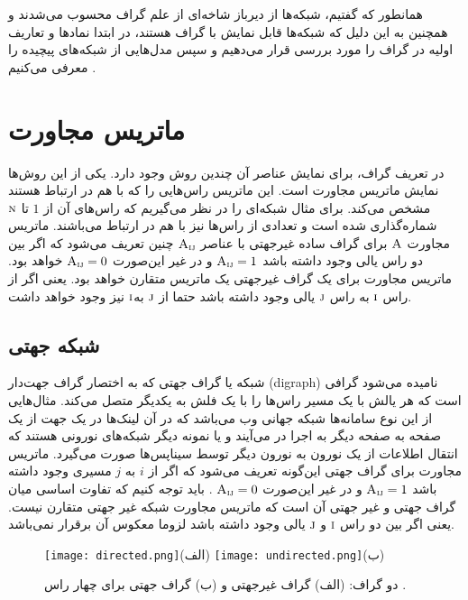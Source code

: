 همانطور که گفتیم، شبکه‌ها از دیرباز شاخه‌ای از علم گراف محسوب می‌شدند و همچنین به این دلیل که شبکه‌ها قابل نمایش با گراف هستند، در ابتدا نماد‌ها و تعاریف اولیه در گراف را مورد بررسی قرار می‌دهیم و سپس مدل‌هایی از شبکه‌های پیچیده را معرفی می‌کنیم \cite{new}.
\section{ماتریس مجاورت}
در تعریف گراف، برای نمایش عناصر آن چندین روش وجود دارد. یکی از این روش‌ها نمایش ماتریس مجاورت است. این ماتریس راس‌هایی را که با هم در ارتباط هستند مشخص می‌کند. برای مثال شبکه‌ای را در نظر می‌گیریم که راس‌های آن از $1$ تا $\textsc{n}$ شماره‌گذاری شده است و تعدادی از راس‌ها نیز با‌ هم در ارتباط می‌باشند. ماتریس مجاورت $\textsc{A}$ برای گراف ساده غیرجهتی با عناصر $\textsc{A}_{\textsc{ij}}$ چنین تعریف می‌شود که اگر بین دو راس یالی وجود داشته باشد $\textsc{A}_{\textsc{ij}} = 1$ و در غیر این‌صورت 
$\textsc{A}_{\textsc{ij}} = 0$ خواهد بود. ماتریس مجاورت برای یک گراف غیرجهتی یک ماتریس متقارن خواهد بود. یعنی اگر از راس $\textsc{i}$ به راس $\textsc{j}$ یالی وجود داشته باشد حتما از $\textsc{j}$ به$\textsc{i}$ نیز وجود خواهد داشت. %
\subsection{شبکه جهتی}
شبکه یا گراف جهتی که به اختصار گراف ‌جهت‌دار (digraph) نامیده می‌شود گرافی‌ است که هر یالش با یک مسیر راس‌ها را با یک فلش به یکدیگر متصل می‌کند. مثال‌هایی از این نوع سامانه‌ها شبکه جهانی وب می‌باشد که در آن لینک‌ها در یک جهت از یک صفحه به صفحه دیگر به اجرا در می‌آیند و یا نمونه دیگر شبکه‌های نورونی هستند که انتقال اطلاعات از یک نورون به نورون دیگر توسط سیناپس‌ها صورت می‌گیرد. ماتریس مجاورت برای گراف جهتی این‌گونه تعریف می‌شود که اگر از $i$ به $j$ مسیری وجود داشته باشد 
$\textsc{A}_{\textsc{ij}} = 1$  و در غیر این‌‌صورت $\textsc{A}_{\textsc{ij}} = 0$ . باید توجه کنیم که تفاوت اساسی میان گراف جهتی و غیر جهتی  آن است که ماتریس مجاورت شبکه غیر جهتی متقارن نیست.  یعنی اگر بین دو راس $\textsc{i}$ و $\textsc{j}$ یالی وجود داشته باشد لزوما معکوس آن برقرار نمی‌باشد. %
\begin{figure}[htbp]
\hspace*{0cm}
\centering
\texttt{[image: directed.png]}\centering(الف)
\texttt{[image: undirected.png]}\centering(ب)
\caption[تقسیم‌بندی گراف جهتی و غیر جهتی] {\footnotesize دو گراف: (الف) گراف غیرجهتی  و (ب) گراف جهتی برای چهار راس \cite{network}.}
\end{figure}

